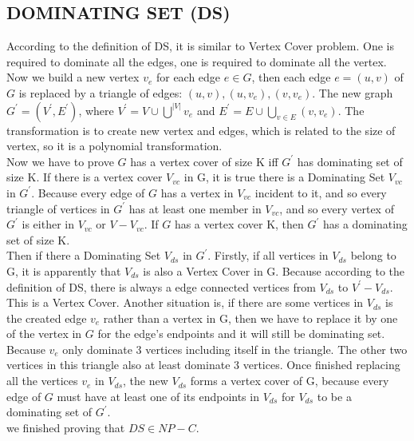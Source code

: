 \documentclass[12pt]{report}
\begin{document}
\subsection{DOMINATING SET (DS)}
According to the definition of DS, it is similar to Vertex Cover problem. One is required to dominate all the edges, one is required to dominate all the vertex. \\
Now we build a new vertex $v_{e}$ for each edge $e \in G$, then each edge $e = (u, v)$ of $G$ is replaced by a triangle of edges: $(u, v), (u, v_{e}), (v, v_{e})$. The new graph $G^{'} = (V^{'}, E^{'})$, where $V^{'} = V \cup \bigcup^{|V|}v_{e}$ and $E^{'} = E \cup \bigcup_{v \in E}(v, v_{e})$. The transformation is to create new vertex and edges, which is related to the size of vertex, so it is a polynomial transformation. \\
Now we have to prove $G$ has a vertex cover of size K iff $G^{'}$ has dominating set of size K. If there is a vertex cover $V_{vc}$ in G, it is true there is a Dominating Set $V_{vc}$ in $G^{'}$. Because every edge of $G$ has a vertex in $V_{vc}$ incident to it, and so every triangle of vertices in $G^{'}$ has at least one member in $V_{vc}$, and so every vertex of $G^{'}$ is either in $V_{vc}$ or $V - V_{vc}$. If $G$ has a vertex cover K, then $G^{'}$ has a dominating set of size K. \\
Then if there a Dominating Set $V_{ds}$ in $G^{'}$. Firstly, if all vertices in $V_{ds}$ belong to G, it is apparently that $V_{ds}$ is also a Vertex Cover in G. Because according to the definition of DS, there is always a edge connected vertices from $V_{ds}$ to $V^{'} - V_{ds}$. This is a Vertex Cover. Another situation is, if there are some vertices in $V_{ds}$ is the created edge $v_{e}$ rather than a vertex in G, then we have to replace it by one of the vertex in $G$ for the edge's endpoints and it will still be dominating set. Because $v_{e}$ only dominate 3 vertices including itself in the triangle. The other two vertices in this triangle also at least dominate 3 vertices. Once finished replacing all the vertices $v_{e}$ in $V_{ds}$, the new $V_{ds}$ forms a vertex cover of G, because every edge of $G$ must have at least one of its endpoints in $V_{ds}$ for $V_{ds}$ to be a dominating set of $G^{'}$. \\
we finished proving that $DS \in NP-C$.
\end{document}
